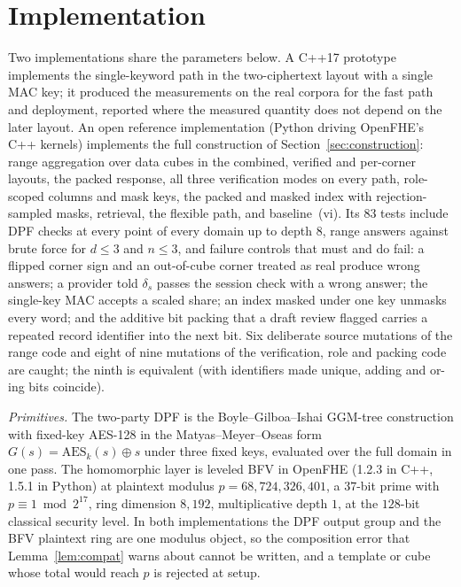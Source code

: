 \documentclass[a4paper,fleqn]{cas-sc}
\newif\ifauthorchecks
\newcommand{\authorcheck}[1]{\ifauthorchecks{\color{red}\textsf{[Authors: #1]}}\fi}
\begin{document}
\section{Implementation}
\label{sec:impl}
Two implementations share the parameters below. A C++17 prototype implements
the single-keyword path in the two-ciphertext layout with a single MAC key; it
produced the measurements on the real corpora for the fast path and deployment,
reported where the measured quantity does not depend on the later layout.
\authorcheck{Publish the C++ prototype next to the reference implementation,
and re-measure in it the items marked below.} An open reference implementation
(Python driving OpenFHE's C++ kernels) implements the full construction of
Section~\ref{sec:construction}: range aggregation over data cubes in the
combined, verified and per-corner layouts, the packed response, all three
verification modes on every path, role-scoped columns and mask keys, the packed
and masked index with rejection-sampled masks, retrieval, the flexible path,
and baseline~(vi). Its $83$ tests include DPF checks at every point of every
domain up to depth $8$, range answers against brute force for $d\le3$ and
$n\le3$, and failure controls that must and do fail: a flipped corner sign and
an out-of-cube corner treated as real produce wrong answers; a provider told
$\delta_s$ passes the session check with a wrong answer; the single-key MAC
accepts a scaled share; an index masked under one key unmasks every word; and
the additive bit packing that a draft review flagged carries a repeated record
identifier into the next bit. Six deliberate source mutations of the range code
and eight of nine mutations of the verification, role and packing code are
caught; the ninth is equivalent (with identifiers made unique, adding and
or-ing bits coincide).

\emph{Primitives.} The two-party DPF is the Boyle--Gilboa--Ishai GGM-tree
construction \citep{boyle2016function} with fixed-key AES-128 in the
Matyas--Meyer--Oseas form $G(s)=\mathrm{AES}_k(s)\oplus s$ under three fixed
keys, evaluated over the full domain in one pass. The homomorphic layer is
leveled BFV in OpenFHE \citep{openfhe} (1.2.3 in C++, 1.5.1 in Python) at
plaintext modulus $p=68{,}724{,}326{,}401$, a $37$-bit prime with $p\equiv1
\bmod 2^{17}$, ring dimension $8{,}192$, multiplicative depth $1$, at the
$128$-bit classical security level. In both implementations the DPF output
group and the BFV plaintext ring are one modulus object, so the composition
error that Lemma~\ref{lem:compat} warns about cannot be written, and a
template or cube whose total would reach $p$ is rejected at setup.
\end{document}
